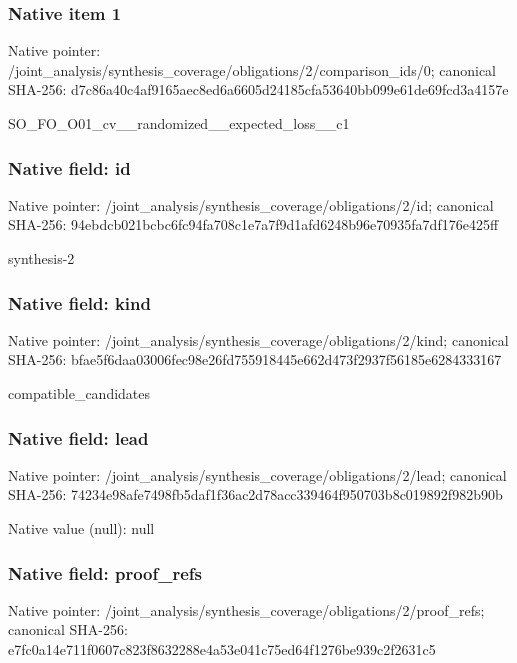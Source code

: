 \documentclass[10pt,a4paper]{article}
\begin{document}
\subsubsection{Native item 1}
Native pointer: /joint\_\allowbreak{}analysis/synthesis\_\allowbreak{}coverage/obligations/2/comparison\_\allowbreak{}ids/0; canonical SHA-256: d7c86a40c4af9165aec8ed6a6605d24185cfa53640bb099e61de69fcd3a4157e

\begingroup\raggedright\sloppy SO\_\allowbreak{}FO\_\allowbreak{}O01\_\allowbreak{}cv\_\allowbreak{}\_\allowbreak{}randomized\_\allowbreak{}\_\allowbreak{}expected\_\allowbreak{}loss\_\allowbreak{}\_\allowbreak{}c1\par\endgroup

\subsubsection{Native field: id}
Native pointer: /joint\_\allowbreak{}analysis/synthesis\_\allowbreak{}coverage/obligations/2/id; canonical SHA-256: 94ebdcb021bcbc6fc94fa708c1e7a7f9d1afd6248b96e70935fa7df176e425ff

\begingroup\raggedright\sloppy synthesis-2\par\endgroup

\subsubsection{Native field: kind}
Native pointer: /joint\_\allowbreak{}analysis/synthesis\_\allowbreak{}coverage/obligations/2/kind; canonical SHA-256: bfae5f6daa03006fec98e26fd755918445e662d473f2937f56185e6284333167

\begingroup\raggedright\sloppy compatible\_\allowbreak{}candidates\par\endgroup

\subsubsection{Native field: lead}
Native pointer: /joint\_\allowbreak{}analysis/synthesis\_\allowbreak{}coverage/obligations/2/lead; canonical SHA-256: 74234e98afe7498fb5daf1f36ac2d78acc339464f950703b8c019892f982b90b

Native value (null): null

\subsubsection{Native field: proof\_\allowbreak{}refs}
Native pointer: /joint\_\allowbreak{}analysis/synthesis\_\allowbreak{}coverage/obligations/2/proof\_\allowbreak{}refs; canonical SHA-256: e7fc0a14e711f0607c823f8632288e4a53e041c75ed64f1276be939c2f2631c5
\end{document}
